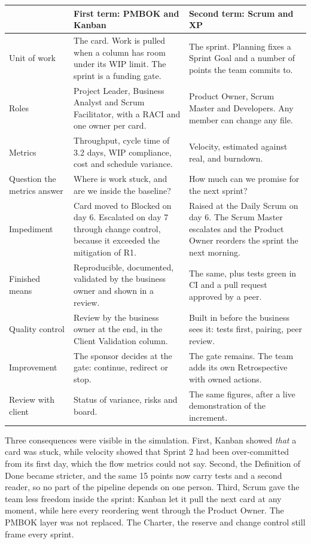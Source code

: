 \documentclass[10pt,a4paper]{article}
\begin{document}
{\footnotesize
\begin{tabularx}{\linewidth}{@{}>{\raggedright\arraybackslash}p{2.5cm} L L@{}}
\toprule
 & First term: PMBOK and Kanban & Second term: Scrum and XP \\
\midrule
Unit of work & The card. Work is pulled when a column has room under its WIP limit. The sprint is a funding gate. & The sprint. Planning fixes a Sprint Goal and a number of points the team commits to. \\
Roles & Project Leader, Business Analyst and Scrum Facilitator, with a RACI and one owner per card. & Product Owner, Scrum Master and Developers. Any member can change any file. \\
Metrics & Throughput, cycle time of 3.2 days, WIP compliance, cost and schedule variance. & Velocity, estimated against real, and burndown. \\
Question the metrics answer & Where is work stuck, and are we inside the baseline? & How much can we promise for the next sprint? \\
Impediment & Card moved to Blocked on day 6. Escalated on day 7 through change control, because it exceeded the mitigation of R1. & Raised at the Daily Scrum on day 6. The Scrum Master escalates and the Product Owner reorders the sprint the next morning. \\
Finished means & Reproducible, documented, validated by the business owner and shown in a review. & The same, plus tests green in CI and a pull request approved by a peer. \\
Quality control & Review by the business owner at the end, in the Client Validation column. & Built in before the business sees it: tests first, pairing, peer review. \\
Improvement & The sponsor decides at the gate: continue, redirect or stop. & The gate remains. The team adds its own Retrospective with owned actions. \\
Review with client & Status of variance, risks and board. & The same figures, after a live demonstration of the increment. \\
\bottomrule
\end{tabularx}}

Three consequences were visible in the simulation. First, Kanban showed \emph{that} a card was stuck, while velocity showed
that Sprint 2 had been over-committed from its first day, which the flow metrics could not say. Second, the
Definition of Done became stricter, and the same 15 points now carry tests and a second reader, so no part of the pipeline
depends on one person. Third, Scrum gave the team less freedom inside the sprint: Kanban let it pull the next card at any
moment, while here every reordering went through the Product Owner. The PMBOK layer was not replaced. The Charter, the
reserve and change control still frame every sprint.
\end{document}
